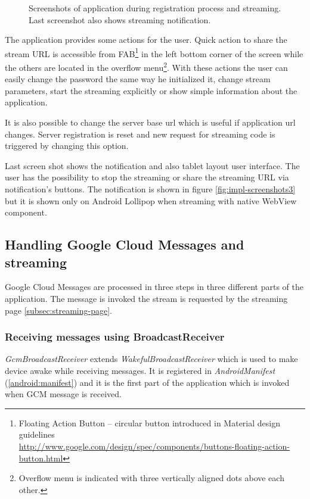 \begin{figure}[H]
	\caption{Screenshots of application during registration process and streaming. Last screenshot also shows streaming notification.}
	\label{fig:impl-screenshots2}
\end{figure}

\newpage
The application provides some actions for the user. Quick action to share the stream URL is accessible from FAB\footnote{Floating Action Button -- circular button introduced in Material design guidelines\\ \url{http://www.google.com/design/spec/components/buttons-floating-action-button.html}} in the left bottom corner of the screen while the others are located in the overflow menu\footnote{Overflow menu is indicated with three vertically aligned dots above each other.}. With these actions the user can easily change the password the same way he initialized it, change stream parameters, start the streaming explicitly or show simple information about the application.

It is also possible to change the server base url which is useful if application url changes. Server registration is reset and new request for streaming code is triggered by changing this option.

Last screen shot shows the notification and also tablet layout user interface. The user has the possibility to stop the streaming or share the streaming URL via notification's buttons. The notification is shown in figure \ref{fig:impl-screenshots3} but it is shown only on Android Lollipop when streaming with native WebView component.


\newpage
\subsection{Handling Google Cloud Messages and streaming}
Google Cloud Messages are processed in three steps in three different parts of the application. The message is invoked the stream is requested by the streaming page \ref{subsec:streaming-page}.

\subsubsection{Receiving messages using BroadcastReceiver}
\textit{GcmBroadcastReceiver} extends \textit{WakefulBroadcastReceiver} which is used to make device awake while receiving messages. It is registered in \textit{AndroidManifest} (\ref{android:manifest}) and it is the first part of the application which is invoked when GCM message is received.

